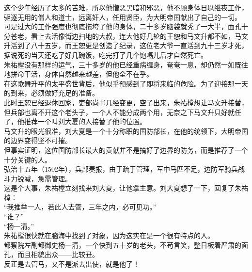 \begin{multicols}{\theparacolNo}
这个少年经历了太多的苦难，所以他憎恶黑暗和邪恶，他不顾身体日以继夜工作，驱逐无用的僧人和道士，远离奸人，任用贤臣，为大明帝国献出了自己的一切。\\

可是过大的工作强度也彻底拖垮了他的身体，二十多岁脑袋就秃了一大半，面孔十分苍老，看上去活像街边扫地的大叔，连大他好几轮的王恕和马文升都不如，马文升活到了八十五岁，而王恕更是创造了纪录，这位老大爷一直活到九十三岁才死，据说死的当天还吃了好几碗饭，吃完打了几个饱嗝儿后才自然死亡。\\

朱祐樘没有那样的运气，三十多岁的他已经重病缠身，奄奄一息，却仍然一如既往地拼命干活，身体自然越来越差，但他全不在乎。\\

在这歌舞升平的太平盛世背后，他似乎预感到了即将来临的危险。为了迎接那一天的到来，必须做好充足的准备。\\

此时王恕已经退休回家，吏部尚书几经变更，空了出来，朱祐樘想让马文升接替，但兵部也离不开这个老头子，一个人不能分成两个用，无奈之下马文升只好就任了，他推荐一个叫刘大夏的人接替了他的位置。\\

马文升的眼光很准，刘大夏是一个十分称职的国防部长，在他的统领下，大明帝国的边界变得坚不可摧。\\

但事实证明，这位国防部长最大的贡献并不是搞好了边界的防务，而是推荐了一个十分关键的人。\\

弘治十五年（1502年），兵部奏报，由于疏于管理，军中马匹不足，边防军骑兵战斗力锐减，急需管理。\\

这是个大事，朱祐樘立刻找来刘大夏，让他拿主意。刘大夏想了一下，回复了朱祐樘：\\

“我推举一人，若此人去管，三年之内，必可见功。”\\

“谁？”\\

“杨一清。”\\

朱祐樘很快就在脑海中找到了对象，因为这实在是一个很有特点的人。\\

都察院左副都御史杨一清，一个快到五十岁的老头，不苟言笑，整日板着严肃的面孔，而且相貌出众——比较丑。\\

反正是去管马，又不是派去出使，就是他了！\\


\end{multicols}
